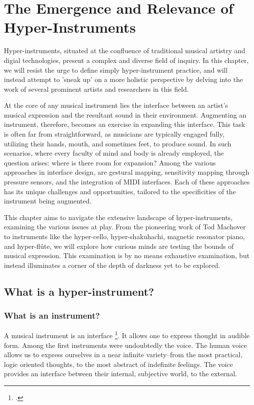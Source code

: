 \documentclass[12pt,twoside,maitrise]{dms_ks}
\theoremstyle{definition}
\begin{document}
\chapter{The Emergence and Relevance of Hyper-Instruments}

Hyper-instruments, situated at the confluence of traditional musical artistry and digial technologies, present a complex and diverse field of inquiry.
In this chapter, we will resist the urge to define simply hyper-instrument practice, and will instead attempt to 'sneak up' on a more holistic perspective by delving into the work of several prominent artists and researchers in this field.

At the core of any musical instrument lies the interface between an artist's musical expression and the resultant sound in their environment.
Augmenting an instrument, therefore, becomes an exercise in expanding this interface.
This task is often far from straightforward, as musicians are typically engaged fully, utilizing their hands, mouth, and sometimes feet, to produce sound.
In such scenarios, where every faculty of mind and body is already employed, the question arises: where is there room for expansion?
Among the various approaches in interface design, are gestural mapping, sensitivity mapping through pressure sensors, and the integration of MIDI interfaces.
Each of these approaches has its unique challenges and opportunities, tailored to the specificities of the instrument being augmented.

This chapter aims to navigate the extensive landscape of hyper-instruments, examining the various issues at play.
From the pioneering work of Tod Machover to instruments like the hyper-cello, hyper-shakuhachi, magnetic resonator piano, and hyper-flûte, we will explore how curious minds are testing the bounds of musical expression.
This examination is by no means exhaustive examination, but instead illuminates a corner of the depth of darkness yet to be explored. 

\section{What is a hyper-instrument?}

\subsection{What is an instrument?}

A musical instrument is an interface \footcite{noauthor_instrument_nodate}. 
It allows one to express thought in audible form. 
Among the first instruments were undoubtedly the voice. 
The human voice allows us to express ourselves in a near infinite variety--from the most practical, logic oriented thoughts, to the most abstract of indefinite feelings. 
The voice provides an interface between their internal, subjective world, to the external. 
\end{document}
